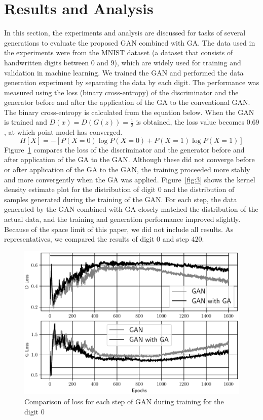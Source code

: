 \section{Results and Analysis}
\label{sec:results}
In this section, the experiments and analysis are discussed for tasks of several generations to evaluate the proposed GAN combined with GA. The data used in the experiments were from the MNIST dataset (a dataset that consists of handwritten digits between \(0\) and \(9\)), which are widely used for training and validation in machine learning. We trained the GAN and performed the data generation experiment by separating the data by each digit. The performance was measured using the loss (binary cross-entropy) of the discriminator and the generator before and after the application of the GA to the conventional GAN. The binary cross-entropy is calculated from the equation below. When the GAN is trained and \(D\left(x\right)=D\left(G\left(z\right)\right) = \frac{1}{2}\) is obtained, the loss value becomes \(0.69\), at which point model has converged.
\begin{equation}
    H\left[X\right] = -\left[P\left(X=0\right)\log{P\left(X=0\right) + P\left(X=1\right)\log{P\left(X=1\right)}}\right]
\end{equation}
Figure~\ref{fig:2} compares the loss of the discriminator and the generator before and after application of the GA to the GAN. Although these did not converge before or after application of the GA to the GAN, the training proceeded more stably and more convergently when the GA was applied. Figure~\ref{fig:3} shows the kernel density estimate plot for the distribution of digit \(0\) and the distribution of samples generated during the training of the GAN. For each step, the data generated by the GAN combined with GA closely matched the distribution of the actual data, and the training and generation performance improved slightly. Because of the space limit of this paper, we did not include all results. As representatives, we compared the results of digit \(0\) and step \(420\).

\begin{figure}[t]
\centering
\includegraphics[width=\columnwidth]{figure-2}
\caption{Comparison of loss for each step of GAN during training for the digit \(0\)}
\label{fig:2}
\end{figure}

